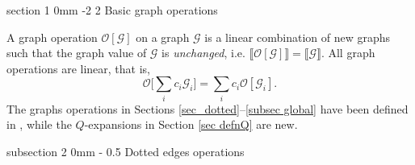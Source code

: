 \documentclass{article}
\makeatletter
\newcommand{\1}{\mathds{1}}
\numberwithin{equation}{section}
\newcommand{\al}{\alpha}
\newcommand{\be}{\begin{equation}}
\newcommand{\ee}{\end{equation}}
\renewcommand{\cal}{\mathcal}
\newcommand{\dashed}{\text{diffusive}}
\theoremstyle{plain} %
\newtheorem{definition}[theorem]{Definition}
\theoremstyle{remark}
\newtheorem{remark}[theorem]{Remark}
\renewcommand{\section}{\@startsection
	{section}%
	{1}%
	{0mm}%
	{-2\baselineskip}%
	{2\baselineskip}%
	{\normalfont\large\scshape\centering}} %
\renewcommand{\subsection}{\@startsection
	{subsection}%
	{2}%
	{0mm}%
	{-\baselineskip}%
	{0.5\baselineskip}%
	{\normalfont\bf\itshape}} %
\makeatother
\begin{document}
\section{Basic graph operations}\label{sec_basiclocal}
  
A graph operation $\cal O[\cal G]$ on a graph $\cal G$ is a linear combination of new graphs such that the graph value of  $\cal G$ 
is \emph{unchanged}, i.e. $\llbracket \cal O[\cal G]\rrbracket=\llbracket \cal G\rrbracket$. All graph operations are linear, that is,
\be\label{linear graphO} \cal O\Big[\sum_i c_i  \cal G_i\Big] =\sum_i c_i \cal O\left[ \cal G_i\right].
\ee
The graphs operations in Sections \ref{sec_dotted}--\ref{subsec global} have been defined in \cite[Section 3]{PartI_high}, while the $Q$-expansions in Section \ref{sec defnQ} are new. 
  
\subsection{Dotted edges operations}\label{sec_dotted}
  
  

%  
  
\end{document}
